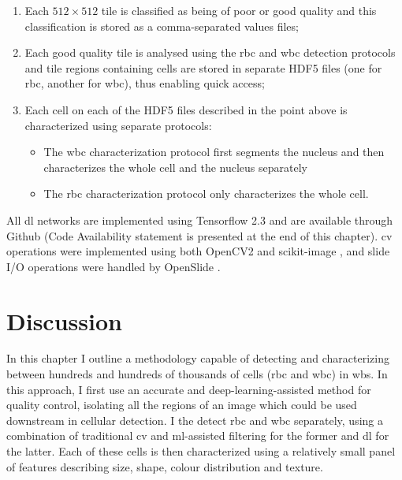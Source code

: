 \begin{enumerate}
    \item Each $512 \times 512$ tile is classified as being of poor or good quality and this classification is stored as a comma-separated values files;
    \item Each good quality tile is analysed using the \ac{rbc} and \ac{wbc} detection protocols and tile regions containing cells are stored in separate HDF5 files (one for \ac{rbc}, another for \ac{wbc}), thus enabling quick access;
    \item Each cell on each of the HDF5 files described in the point above is characterized using separate protocols:
    \begin{itemize}
        \item The \ac{wbc} characterization protocol first segments the nucleus and then characterizes the whole cell and the nucleus separately
        \item The \ac{rbc} characterization protocol only characterizes the whole cell.
    \end{itemize}
\end{enumerate}

All \ac{dl} networks are implemented using Tensorflow 2.3 \cite{tensorflow2015-whitepaper} and are available through Github (Code Availability statement is presented at the end of this chapter). \Ac{cv} operations were implemented using both OpenCV2 \cite{opencv_library} and scikit-image \cite{van2014scikit}, and slide I/O operations were handled by OpenSlide \cite{Goode2013-zs}.

\section{Discussion}

In this chapter I outline a methodology capable of detecting and characterizing between hundreds and hundreds of thousands of cells (\ac{rbc} and \ac{wbc}) in \ac{wbs}. In this approach, I first use an accurate and deep-learning-assisted method for quality control, isolating all the regions of an image which could be used downstream in cellular detection. I the detect \ac{rbc} and \ac{wbc} separately, using a combination of traditional \ac{cv} and \ac{ml}-assisted filtering for the former and \ac{dl} for the latter. Each of these cells is then characterized using a relatively small panel of features describing size, shape, colour distribution and texture.

